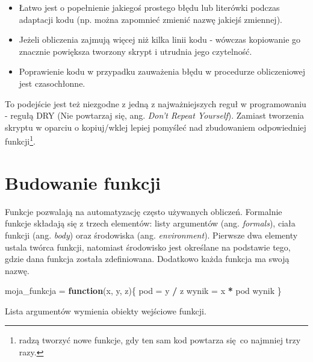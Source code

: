 \documentclass[paper=6in:9in,pagesize=pdftex,headinclude=on,footinclude=on,10pt]{scrbook}
\newenvironment{Shaded}{\begin{snugshade}}{\end{snugshade}}
\newcommand{\CommentTok}[1]{\textcolor[rgb]{0.56,0.35,0.01}{\textit{#1}}}
\newcommand{\ControlFlowTok}[1]{\textcolor[rgb]{0.13,0.29,0.53}{\textbf{#1}}}
\newcommand{\KeywordTok}[1]{\textcolor[rgb]{0.13,0.29,0.53}{\textbf{#1}}}
\newcommand{\NormalTok}[1]{#1}
\newcommand{\OperatorTok}[1]{\textcolor[rgb]{0.81,0.36,0.00}{\textbf{#1}}}
\newcommand{\StringTok}[1]{\textcolor[rgb]{0.31,0.60,0.02}{#1}}
\providecommand{\tightlist}{%
  \setlength{\itemsep}{0pt}\setlength{\parskip}{0pt}}
\begin{document}
\begin{itemize}
\tightlist
\item
  Łatwo jest o popełnienie jakiegoś prostego błędu lub literówki podczas adaptacji kodu (np. można zapomnieć zmienić nazwę jakiejś zmiennej).
\item
  Jeżeli obliczenia zajmują więcej niż kilka linii kodu - wówczas kopiowanie go znacznie powiększa tworzony skrypt i utrudnia jego czytelność.
\item
  Poprawienie kodu w przypadku zauważenia błędu w procedurze obliczeniowej jest czasochłonne.
\end{itemize}

To podejście jest też niezgodne z jedną z najważniejszych reguł w programowaniu - regułą DRY (Nie powtarzaj się, ang. \emph{Don't Repeat Yourself}).
Zamiast tworzenia skryptu w oparciu o kopiuj/wklej lepiej pomyśleć nad zbudowaniem odpowiedniej funkcji\footnote{\citet{wickham2016r} radzą tworzyć nowe funkcje, gdy ten sam kod powtarza się~co najmniej trzy razy.}.

\hypertarget{budowanie-funkcji}{%
\section{Budowanie funkcji}\label{budowanie-funkcji}}

Funkcje pozwalają na automatyzację często używanych obliczeń.
Formalnie funkcje składają się z trzech elementów: listy argumentów (ang. \emph{formals}), ciała funkcji (ang. \emph{body}) oraz środowiska (ang. \emph{environment}).
Pierwsze dwa elementy ustala twórca funkcji, natomiast środowisko jest określane na podstawie tego, gdzie dana funkcja została zdefiniowana.
Dodatkowo każda funkcja ma swoją nazwę.

\begin{Shaded}
\begin{Highlighting}[]
\NormalTok{moja_funkcja =}\StringTok{ }\ControlFlowTok{function}\NormalTok{(x, y, z)\{}
\NormalTok{  pod =}\StringTok{ }\NormalTok{y }\OperatorTok{/}\StringTok{ }\NormalTok{z}
\NormalTok{  wynik =}\StringTok{ }\NormalTok{x }\OperatorTok{*}\StringTok{ }\NormalTok{pod}
\NormalTok{  wynik}
\NormalTok{\}}
\end{Highlighting}
\end{Shaded}

Lista argumentów wymienia obiekty wejściowe funkcji.

\begin{Shaded}
\end{Shaded}
\end{document}
